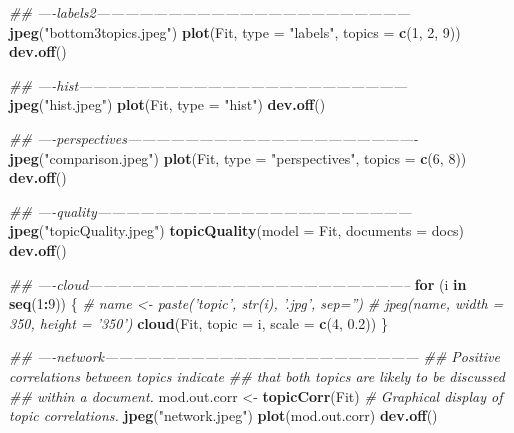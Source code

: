 \documentclass[]{article}
\newenvironment{Shaded}{\begin{snugshade}}{\end{snugshade}}
\newcommand{\CommentTok}[1]{\textcolor[rgb]{0.56,0.35,0.01}{\textit{#1}}}
\newcommand{\ControlFlowTok}[1]{\textcolor[rgb]{0.13,0.29,0.53}{\textbf{#1}}}
\newcommand{\DataTypeTok}[1]{\textcolor[rgb]{0.13,0.29,0.53}{#1}}
\newcommand{\DecValTok}[1]{\textcolor[rgb]{0.00,0.00,0.81}{#1}}
\newcommand{\FloatTok}[1]{\textcolor[rgb]{0.00,0.00,0.81}{#1}}
\newcommand{\KeywordTok}[1]{\textcolor[rgb]{0.13,0.29,0.53}{\textbf{#1}}}
\newcommand{\NormalTok}[1]{#1}
\newcommand{\OperatorTok}[1]{\textcolor[rgb]{0.81,0.36,0.00}{\textbf{#1}}}
\newcommand{\StringTok}[1]{\textcolor[rgb]{0.31,0.60,0.02}{#1}}
\begin{document}
\begin{Shaded}
\begin{Highlighting}[]
\CommentTok{## ----labels2------------------------------------------------------------------}
\KeywordTok{jpeg}\NormalTok{(}\StringTok{"bottom3topics.jpeg"}\NormalTok{)}
\KeywordTok{plot}\NormalTok{(Fit, }\DataTypeTok{type =} \StringTok{"labels"}\NormalTok{, }\DataTypeTok{topics =} \KeywordTok{c}\NormalTok{(}\DecValTok{1}\NormalTok{, }\DecValTok{2}\NormalTok{, }\DecValTok{9}\NormalTok{))}
\KeywordTok{dev.off}\NormalTok{()}


\CommentTok{## ----hist---------------------------------------------------------------------}
\KeywordTok{jpeg}\NormalTok{(}\StringTok{"hist.jpeg"}\NormalTok{)}
\KeywordTok{plot}\NormalTok{(Fit, }\DataTypeTok{type =} \StringTok{"hist"}\NormalTok{)}
\KeywordTok{dev.off}\NormalTok{()}


\CommentTok{## ----perspectives-------------------------------------------------------------}
\KeywordTok{jpeg}\NormalTok{(}\StringTok{"comparison.jpeg"}\NormalTok{)}
\KeywordTok{plot}\NormalTok{(Fit, }\DataTypeTok{type =} \StringTok{"perspectives"}\NormalTok{, }\DataTypeTok{topics =} \KeywordTok{c}\NormalTok{(}\DecValTok{6}\NormalTok{, }\DecValTok{8}\NormalTok{))}
\KeywordTok{dev.off}\NormalTok{()}



\CommentTok{## ----quality------------------------------------------------------------------}
\KeywordTok{jpeg}\NormalTok{(}\StringTok{"topicQuality.jpeg"}\NormalTok{)}
\KeywordTok{topicQuality}\NormalTok{(}\DataTypeTok{model =}\NormalTok{ Fit, }\DataTypeTok{documents =}\NormalTok{ docs)}
\KeywordTok{dev.off}\NormalTok{()}


\CommentTok{## ----cloud--------------------------------------------------------------------}
\ControlFlowTok{for}\NormalTok{ (i }\ControlFlowTok{in} \KeywordTok{seq}\NormalTok{(}\DecValTok{1}\OperatorTok{:}\DecValTok{9}\NormalTok{)) \{}
    \CommentTok{# name <- paste('topic', str(i), '.jpg', sep='')}
    \CommentTok{# jpeg(name, width = 350, height = '350')}
    \KeywordTok{cloud}\NormalTok{(Fit, }\DataTypeTok{topic =}\NormalTok{ i, }\DataTypeTok{scale =} \KeywordTok{c}\NormalTok{(}\DecValTok{4}\NormalTok{, }\FloatTok{0.2}\NormalTok{))}
\NormalTok{\}}


\CommentTok{## ----network------------------------------------------------------------------}
\CommentTok{## Positive correlations between topics indicate}
\CommentTok{## that both topics are likely to be discussed}
\CommentTok{## within a document.}
\NormalTok{mod.out.corr <-}\StringTok{ }\KeywordTok{topicCorr}\NormalTok{(Fit)}
\CommentTok{# Graphical display of topic correlations.}
\KeywordTok{jpeg}\NormalTok{(}\StringTok{"network.jpeg"}\NormalTok{)}
\KeywordTok{plot}\NormalTok{(mod.out.corr)}
\KeywordTok{dev.off}\NormalTok{()}
\end{Highlighting}
\end{Shaded}
\end{document}
